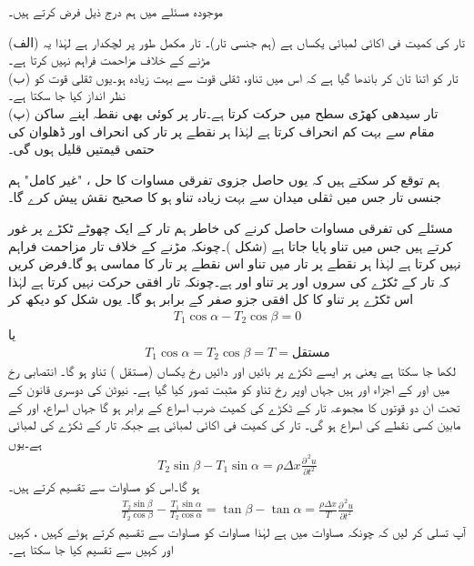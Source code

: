 موجودہ مسئلے میں ہم درج ذیل فرض کرتے ہیں۔

(الف) تار کی کمیت فی اکائی لمبائی یکساں ہے (ہم جنسی تار)۔ تار مکمل طور پر لچکدار ہے لہٰذا یہ مڑنے کے خلاف مزاحمت فراہم نہیں کرتا ہے۔ \\
(ب) تار کو اتنا تان کر باندھا گیا ہے کہ اس میں تناو، ثقلی قوت سے بہت زیادہ ہو۔یوں ثقلی قوت کو نظر انداز کیا جا سکتا ہے۔\\
(پ) تار سیدھی کھڑی سطح میں حرکت کرتا ہے۔تار پر کوئی بھی نقطہ اپنے ساکن مقام سے بہت کم انحراف کرتا ہے لہٰذا ہر نقطے پر تار کی انحراف اور ڈھلوان کی حتمی قیمتیں قلیل ہوں گی۔ 


ہم توقع کر سکتے ہیں کہ یوں حاصل جزوی تفرقی مساوات کا حل ،  "غیر کامل"  ہم جنسی تار جس میں ثقلی میدان سے بہت زیادہ تناو ہو  کا صحیح نقش پیش کرے گا۔  

مسئلے کی تفرقی مساوات حاصل کرنے کی خاطر ہم تار کے ایک چھوٹے ٹکڑے پر غور کرتے ہیں جس میں تناو  پایا جاتا ہے (شکل )۔چونکہ مڑنے کے خلاف تار مزاحمت فراہم نہیں کرتا ہے لہٰذا ہر نقطے پر تار میں تناو اس نقطے پر تار کا مماسی ہو گا۔فرض کریں کہ تار کے ٹکڑے  کی سروں  اور   پر تناو  اور  ہے۔چونکہ تار افقی حرکت نہیں کرتا ہے لہٰذا اس ٹکڑے پر تناو کا کل افقی جزو صفر کے برابر ہو گا۔ یوں شکل  کو دیکھ کر 
\begin{align*}
T_1\cos \alpha-T_2\cos \beta=0
\end{align*}
یا
\begin{align}\label{مساوات_جزوی_تار_الف}
T_1\cos \alpha=T_2\cos \beta=T=\text{مستقل}
\end{align}
لکھا جا سکتا ہے  یعنی ہر ایسے ٹکڑے پر بائیں اور دائیں رخ یکساں (مستقل ) تناو ہو گا۔ انتصابی رخ میں  اور  کے اجزاء  اور  ہیں جہاں اوپر رخ تناو کو مثبت تصور کیا گیا ہے۔ نیوٹن کی دوسری قانون کے تحت ان دو قوتوں کا مجموعہ تار کے ٹکڑے کی کمیت  ضرب  اسراع  کے برابر ہو گا جہاں اسراع،   اور  کے مابین کسی نقطے  کی اسراع ہو گی۔ تار کی کمیت فی اکائی لمبائی  ہے جبکہ تار کے ٹکڑے کی لمبائی  ہے۔یوں
\begin{align}\label{مساوات_جزوی_تار_ب}
T_2\sin \beta-T_1\sin \alpha=\rho\Delta x\frac{\partial^{\,2}u}{\partial t^2}
\end{align} 
ہو گا۔اس کو مساوات  سے تقسیم کرتے ہیں۔
\begin{align}\label{مساوات_جزوی_تار_پ}
\frac{T_2\sin \beta}{T_2\cos \beta}-\frac{T_1\sin \alpha}{T_2\cos \alpha}=\tan \beta -\tan \alpha=\frac{\rho \Delta x}{T}\frac{\partial^{\,2}u}{\partial t^2}
\end{align}
آپ تسلی کر لیں کہ چونکہ مساوات  میں  ہے لہٰذا مساوات  کو مساوات  سے تقسیم کرتے ہوئے کہیں ، کہیں  اور کہیں  سے تقسیم کیا جا سکتا ہے۔ 

